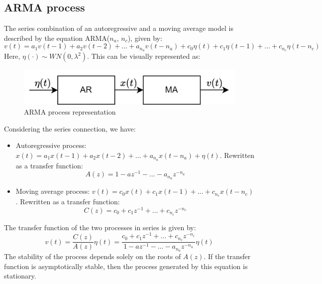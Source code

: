 \subsection{ARMA process}
The series combination of an autoregressive and a moving average model is described by the equation ARMA($n_a$, $n_c$), given by:
\[v(t)=a_1v(t-1) + a_2v(t-2) + \dots + a_{n_a}v(t-n_a) + c_0\eta(t) + c_1\eta(t-1) + \dots + c_{n_c}\eta(t-n_c)\]
Here, $\eta(\cdot) \sim WN(0, \lambda^2)$. 
This can be visually represented as:
\begin{figure}[H]
    \centering
    \includegraphics[width=0.5\linewidth]{images/arma.png} 
    \caption{ARMA process representation}
\end{figure}
Considering the series connection, we have:
\begin{itemize}
    \item Autoregressive process: $x(t) = a_1x(t-1) + a_2x(t-2) + \dots + a_{n_a}x(t-n_a) + \eta(t)$.
        Rewritten as a transfer function:
        \[A(z)=1-az^{-1}-\dots-a_{n_a}z^{-n_a}\]
    \item Moving average process: $v(t) = c_0x(t) + c_1x(t-1) + \dots + c_{n_c}x(t-n_c)$.
        Rewritten as a transfer function:
        \[C(z)=c_0+c_1z^{-1}+\dots+c_{n_c}z^{-n_c}\]
\end{itemize}
The transfer function of the two processes in series is given by:
\[v(t)=\dfrac{C(z)}{A(z)}\eta(t)=\dfrac{c_0+c_1z^{-1}+\dots+c_{n_c}z^{-n_c}}{1-az^{-1}-\dots-a_{n_a}z^{-n_a}}\eta(t)\]
The stability of the process depends solely on the roots of $A(z)$. 
If the transfer function is asymptotically stable, then the process generated by this equation is stationary.

